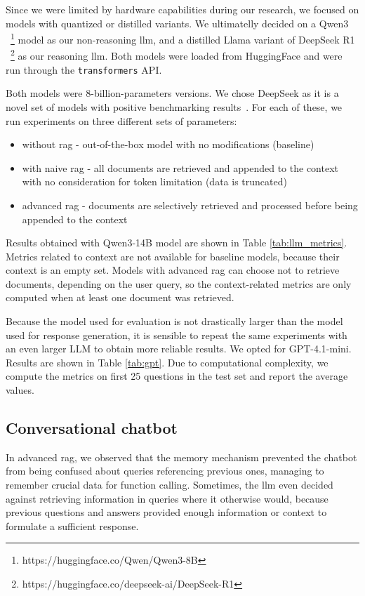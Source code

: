 \documentclass[fleqn,moreauthors,10pt]{ds_report}
\begin{document}
Since we were limited by hardware capabilities during our research, we focused on models with quantized or distilled variants. We ultimatelly decided on a Qwen3 \cite{qwen3}~\footnote{https://huggingface.co/Qwen/Qwen3-8B} model as our non-reasoning \ac{llm}, and a distilled Llama variant of DeepSeek R1 \cite{deepseek3}~\footnote{https://huggingface.co/deepseek-ai/DeepSeek-R1} as our reasoning \ac{llm}. Both models were loaded from HuggingFace and were run through the \texttt{transformers} API.

Both models were 8-billion-parameters versions. We chose DeepSeek as it is a novel set of models with positive benchmarking results~\cite{deepseek3}. For each of these, we run experiments on three different sets of parameters:
\begin{itemize}
	\item without \ac{rag} - out-of-the-box model with no modifications (baseline)
	\item with naive \ac{rag} - all documents are retrieved and appended to the context with no consideration for token limitation (data is truncated)
	\item advanced \ac{rag} - documents are selectively retrieved and processed before being appended to the context
\end{itemize}

Results obtained with Qwen3-14B model are shown in Table \ref{tab:llm_metrics}. Metrics related to context are not available for baseline models, because their context is an empty set. Models with advanced \ac{rag} can choose not to retrieve documents, depending on the user query, so the context-related metrics are only computed when at least one document was retrieved.

Because the model used for evaluation is not drastically larger than the model used for response generation, it is sensible to repeat the same experiments with an even larger LLM to obtain more reliable results. We opted for GPT-4.1-mini. Results are shown in Table \ref{tab:gpt}. Due to computational complexity, we compute the metrics on first 25 questions in the test set and report the average values. 

\subsection*{Conversational chatbot}
In advanced \ac{rag}, we observed that the memory mechanism prevented the chatbot from being confused about queries referencing previous ones, managing to remember crucial data for function calling. Sometimes, the \ac{llm} even decided against retrieving information in queries where it otherwise would, because previous questions and answers provided enough information or context to formulate a sufficient response.
\end{document}
